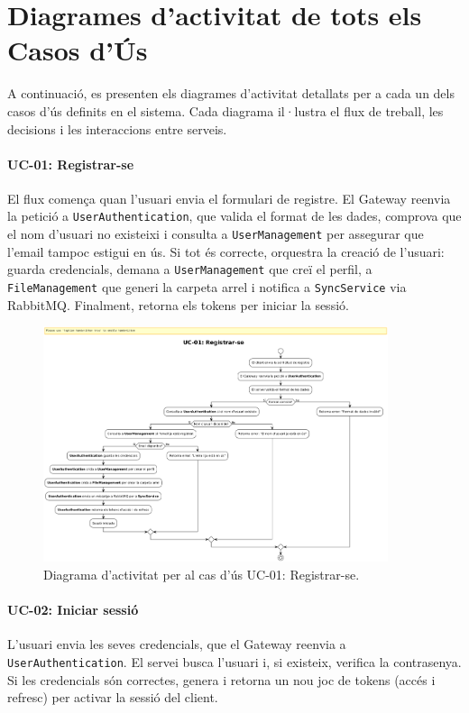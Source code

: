 
\chapter{Diagrames d'activitat de tots els Casos d'Ús}
\label{app:diagrames_activitat}

A continuació, es presenten els diagrames d'activitat detallats per a cada un dels casos d'ús definits en el sistema. Cada diagrama il·lustra el flux de treball, les decisions i les interaccions entre serveis.

\subsubsection{UC-01: Registrar-se}
El flux comença quan l'usuari envia el formulari de registre. El Gateway reenvia la petició a \texttt{UserAuthentication}, que valida el format de les dades, comprova que el nom d'usuari no existeixi i consulta a \texttt{UserManagement} per assegurar que l'email tampoc estigui en ús. Si tot és correcte, orquestra la creació de l'usuari: guarda credencials, demana a \texttt{UserManagement} que creï el perfil, a \texttt{FileManagement} que generi la carpeta arrel i notifica a \texttt{SyncService} via RabbitMQ. Finalment, retorna els tokens per iniciar la sessió.

\begin{figure}[H]
    \centering
    \includegraphics[width=0.9\textwidth]{Figures/ad_UC01.png}
    \caption{Diagrama d'activitat per al cas d'ús UC-01: Registrar-se.}
    \label{fig:ad_uc01_app}
\end{figure}

\subsubsection{UC-02: Iniciar sessió}
L'usuari envia les seves credencials, que el Gateway reenvia a \texttt{UserAuthentication}. El servei busca l'usuari i, si existeix, verifica la contrasenya. Si les credencials són correctes, genera i retorna un nou joc de tokens (accés i refresc) per activar la sessió del client.

